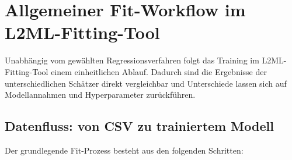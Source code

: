 \documentclass[11pt,a4paper]{report}
\begin{document}
\section{Allgemeiner Fit-Workflow im L2ML-Fitting-Tool}
\label{sec:general_fit_workflow}

Unabh\"{a}ngig vom gew\"{a}hlten Regressionsverfahren folgt das Training im L2ML-Fitting-Tool einem
einheitlichen Ablauf. Dadurch sind die Ergebnisse der unterschiedlichen Sch\"{a}tzer direkt
vergleichbar und Unterschiede lassen sich auf Modellannahmen und Hyperparameter zur\"{u}ckf\"{u}hren.

\subsection{Datenfluss: von CSV zu trainiertem Modell}

Der grundlegende Fit-Prozess besteht aus den folgenden Schritten:
\end{document}
